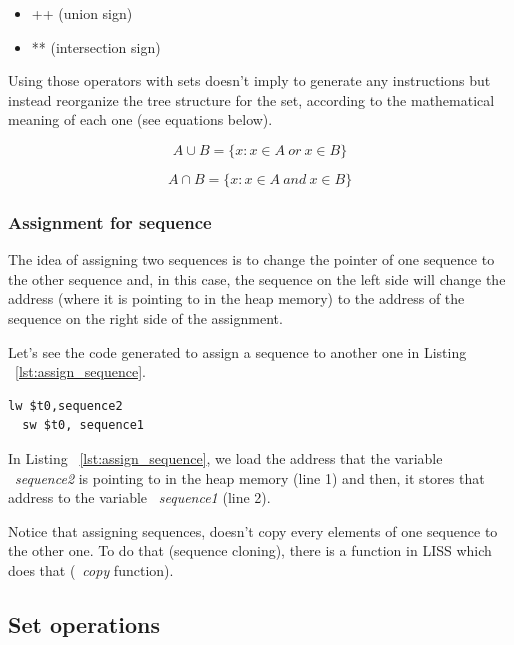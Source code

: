 \documentclass[
  oneside,
  11pt, a4paper,
  footinclude=true,
  headinclude=true,
  cleardoublepage=empty
]{scrbook}
\begin{document}
\begin{itemize}
\item ++ (union sign)
\item ** (intersection sign)
\end{itemize}

Using those operators with sets doesn't imply to generate any instructions but instead reorganize the tree structure for the set, according to the mathematical meaning of each one (see equations below).

\begin{equation}
  A \cup B = \{ x : x \in A\ or\ x \in B\}
\end{equation}

\begin{equation}
  A \cap B = \{ x : x \in A\ and\ x \in B\}
\end{equation}

\subsubsection{Assignment for sequence}

The idea of assigning two sequences is to change the pointer of one sequence to the other sequence and, in this case, the sequence on the left side will change the address (where it is pointing to in the heap memory) to the address of the sequence on the right side of the assignment.

Let's see the code generated to assign a sequence to another one in Listing ~\ref{lst:assign_sequence}.

\begin{lstlisting}[caption={Code generated for line 7 of Listing ~\ref{lst:cases_assignment_liss}},label={lst:assign_sequence}]
  lw $t0,sequence2		
  sw $t0, sequence1		
\end{lstlisting}

In Listing ~\ref{lst:assign_sequence}, we load the address that the variable ~\textit{sequence2} is pointing to in the heap memory (line 1) and then, it stores that address to the variable ~\textit{sequence1} (line 2).

Notice that assigning sequences, doesn't copy every elements of one sequence to the other one. To do that (sequence cloning), there is a function in LISS which does that (~\textit{copy} function).

\subsection{Set operations}
\end{document}
